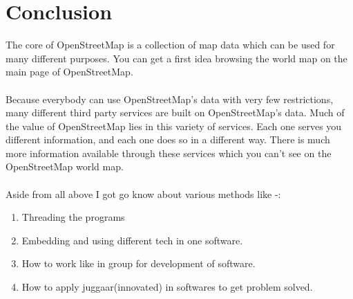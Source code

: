 \section{Conclusion}
The core of OpenStreetMap is a collection of map data which can be used for many different purposes. You can get a first idea browsing the world map on the main page of OpenStreetMap.\\\\
Because everybody can use OpenStreetMap's data with very few restrictions, many different third party services are built on OpenStreetMap's data. Much of the value of OpenStreetMap lies in this variety of services. Each one serves you different information, and each one does so in a different way. There is much more information available through these services which you can't see on the OpenStreetMap world map.\\\\
Aside from all above I got go know about various methods like -:
\begin{enumerate}
\item Threading the programs 
\item Embedding and using different tech in one software.
\item How to work like in group for development of software.
\item How to apply juggaar(innovated) in softwares to get problem solved. 
\end{enumerate}

